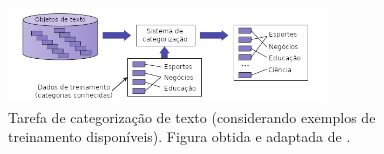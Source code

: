 \begin{figure}[h]
    \centering
    \includegraphics[width=0.75\textwidth]{img/figure15-1-zhai-traduzido.png}
    \caption{Tarefa de categorização de texto (considerando exemplos de treinamento disponíveis). Figura obtida e adaptada de .}
    \label{fig:categorização-de-texto-zhai2016}
\end{figure}